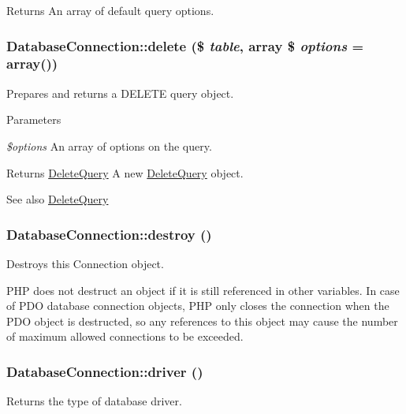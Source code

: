 \begin{DoxyReturn}{Returns}
An array of default query options. 
\end{DoxyReturn}
\hypertarget{classDatabaseConnection_af8bf777ee824d3c2c5a3e18e5941ece4}{
\subsubsection[{delete}]{\setlength{\rightskip}{0pt plus 5cm}DatabaseConnection::delete (\$ {\em table}, \/  array \$ {\em options} = {\ttfamily array()})}}
\label{classDatabaseConnection_af8bf777ee824d3c2c5a3e18e5941ece4}
Prepares and returns a DELETE query object.


\begin{DoxyParams}{Parameters}
\item[{\em \$options}]An array of options on the query.\end{DoxyParams}
\begin{DoxyReturn}{Returns}
\hyperlink{classDeleteQuery}{DeleteQuery} A new \hyperlink{classDeleteQuery}{DeleteQuery} object.
\end{DoxyReturn}
\begin{DoxySeeAlso}{See also}
\hyperlink{classDeleteQuery}{DeleteQuery} 
\end{DoxySeeAlso}
\hypertarget{classDatabaseConnection_a20911bdaaabc2cb0d7af1992ddc96ed5}{
\subsubsection[{destroy}]{\setlength{\rightskip}{0pt plus 5cm}DatabaseConnection::destroy ()}}
\label{classDatabaseConnection_a20911bdaaabc2cb0d7af1992ddc96ed5}
Destroys this Connection object.

PHP does not destruct an object if it is still referenced in other variables. In case of PDO database connection objects, PHP only closes the connection when the PDO object is destructed, so any references to this object may cause the number of maximum allowed connections to be exceeded. \hypertarget{classDatabaseConnection_a4a36a8d7352108c837c51a7172f966c3}{
\subsubsection[{driver}]{\setlength{\rightskip}{0pt plus 5cm}DatabaseConnection::driver ()}}
\label{classDatabaseConnection_a4a36a8d7352108c837c51a7172f966c3}
Returns the type of database driver.

